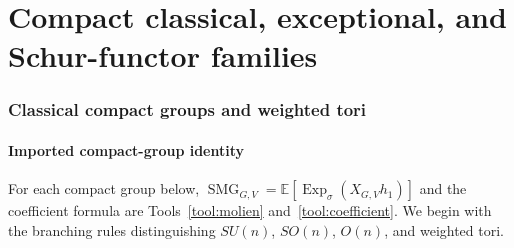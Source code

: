 \documentclass[10pt]{article}
\newcommand{\Sym}{\operatorname{Sym}}
\newcommand{\CT}{\operatorname{CT}}
\newcommand{\ExpS}{\operatorname{Exp}_{\sigma}}
\newcommand{\SMG}{\operatorname{SMG}}
\newcommand{\MGF}{\SMG}
\newcommand{\smgv}[2]{\mathbb E\!\left[\ExpS\!\left(X_{#1,#2}h_1\right)\right]}
\begin{document}
\clearpage
\part{Compact classical, exceptional, and Schur-functor families}
\section{Classical compact groups and weighted tori}\label{proof:classical-compact}
\begingroup
\providecommand{\Sym}{\operatorname{Sym}}
\renewcommand{\Sym}{\operatorname{Sym}}
\providecommand{\CT}{\operatorname{CT}}
\renewcommand{\CT}{\operatorname{CT}}
\providecommand{\SU}{\operatorname{SU}}
\renewcommand{\SU}{\operatorname{SU}}
\providecommand{\SO}{\operatorname{SO}}
\renewcommand{\SO}{\operatorname{SO}}
\providecommand{\OO}{\operatorname{O}}
\renewcommand{\OO}{\operatorname{O}}
\providecommand{\EE}{\mathbb E}
\renewcommand{\EE}{\mathbb E}
\setcounter{theorem}{0}
\setcounter{proposition}{0}
\setcounter{lemma}{0}
\setcounter{corollary}{0}
\setcounter{remark}{0}
\begin{abstract}
We prove the coefficient formulas proposed for the defining representations of
$\SU(n)$, $\SO(n)$, $\OO(n)$, and arbitrary compact tori.  We then describe an
independent matrix calculation: connected-group invariants are the common
kernel of the derived representation, while torus integrals are replaced by
provably alias-free finite diagonal grids.  The accompanying marimo notebooks
perform 100 exact integer comparisons.  All pass.  We also state two necessary
corrections explicitly: orthogonal Schur shapes must have length at most $n$,
and all formulas are interpreted coefficientwise (or after finite truncation).
\end{abstract}

\subsection{Imported compact-group identity}
For each compact group below, $\MGF_{G,V}=\smgv{G}{V}$ and the coefficient
formula are Tools~\ref{tool:molien} and~\ref{tool:coefficient}. We begin with
the branching rules distinguishing $SU(n)$, $SO(n)$, $O(n)$, and weighted
tori.
\end{document}
